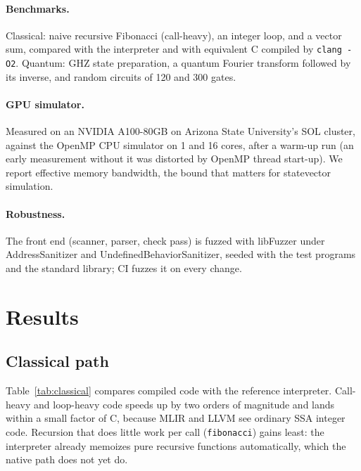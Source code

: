 \documentclass[11pt]{article}
\begin{document}
\paragraph{Benchmarks.} Classical: naive recursive Fibonacci (call-heavy), an integer loop, and a vector sum,
compared with the interpreter and with equivalent C compiled by \texttt{clang -O2}. Quantum: GHZ state preparation,
a quantum Fourier transform followed by its inverse, and random circuits of 120 and 300 gates.

\paragraph{GPU simulator.} Measured on an NVIDIA A100-80GB on Arizona State University's SOL cluster, against the
OpenMP CPU simulator on 1 and 16 cores, after a warm-up run (an early measurement without it was distorted by
OpenMP thread start-up). We report effective memory bandwidth, the bound that matters for statevector simulation.

\paragraph{Robustness.} The front end (scanner, parser, check pass) is fuzzed with libFuzzer under AddressSanitizer
and UndefinedBehaviorSanitizer, seeded with the test programs and the standard library; CI fuzzes it on every
change.

\section{Results}
\label{sec:results}

\subsection{Classical path}

Table~\ref{tab:classical} compares compiled code with the reference interpreter. Call-heavy and loop-heavy code
speeds up by two orders of magnitude and lands within a small factor of C, because MLIR and LLVM see ordinary SSA
integer code. Recursion that does little work per call (\texttt{fibonacci}) gains least: the interpreter already
memoizes pure recursive functions automatically, which the native path does not yet do.
\end{document}
